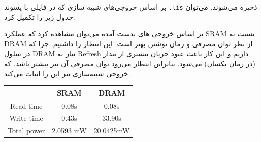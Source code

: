 \documentclass[12pt]{exam}
\begin{document}
\begin{questions}
	 
	 بر اساس خروجی‌های شبیه سازی که در فایلی با پسوند \texttt{.lis} ذخیره می‌شوند. می‌توان جدول زیر را تکمیل کرد.
	 
	 بر اساس خروجی های بدست آمده می‌توان مشاهده کرد که عملکرد SRAM نسبت به DRAM از نظر توان مصرفی و زمان نوشتن بهتر است. این انتظار را داشتیم. چرا که در سلول DRAM نیاز به Refresh داریم و این کار باعث عبود جریان بیشتری از مدار (در زمان یکسان) می‌شود. بنابراین انتظار می‌رود توان مصرفی آن نیز بیشتر باشد. که خروجی شبیه‌سازی نیز این را اثبات می‌کند.
	 
	 
	 
	 \begin{latin}
	 	 \begin{center}
	 	 	\begin{tabular}{||c c c||} 
	 	 		\hline
	 	 		& SRAM & DRAM  \\[0.5ex]
	 	 		\hline\hline
	 	 		Read time & 0.08s & 0.08s \\
	 	 		\hline
	 	 		Write time & 0.43s & 33.90s \\
	 	 		\hline
	 	 		Total power & 2.0593 mW & 20.0425mW \\ [0.5ex] 
	 	 		\hline
	 	 	\end{tabular}
	 	 \end{center}
	 \end{latin}
	 
	
 
 \end{questions}
\end{document}

